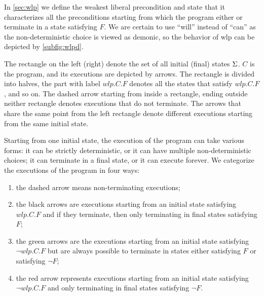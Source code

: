 In \autoref{sec:wlp} we define the weakest liberal precondition and state that it characterizes all the preconditions starting from which the program either  or  terminate in a state satisfying $F$. 
We are certain to use ``will'' instead of ``can'' as the non-deterministic choice is viewed as demonic, so the behavior of wlp can be depicted by \autoref{subfig:wlpd}. 

The rectangle on the left (right) denote the set of all initial (final) states $\S$. 
$C$ is the program, and its executions are depicted by arrows. 
The rectangle is divided into halves, the part with label $wlp.C.F$ denotes all the states that satisfy $wlp.C.F$, and so on. 
The dashed arrow starting from inside a rectangle, ending outside neither rectangle denotes executions that do not terminate. 
The arrows that share the same point from the left rectangle denote different executions starting from the same initial state. 

Starting from one initial state, the execution of the program can take various forms: it can be strictly deterministic, or it can have multiple non-deterministic choices; it can terminate in a final state, or it can execute forever. 
We categorize the executions of the program in four ways: 
\begin{enumerate}
	\item the dashed arrow means non-terminating executions; 
	\item the black arrows are executions starting from an initial state satisfying $wlp.C.F$ and if they terminate, then only terminating in final states satisfying $F$; 
	\item the green arrows are the executions starting from an initial state satisfying $\neg wlp.C.F$ but are always possible to terminate in states either satisfying $F$ or satisfying $\neg F$;
	\item the red arrow represents executions starting from an initial state satisfying $\neg wlp.C.F$ and only terminating in final states satisfying $\neg F$. 
\end{enumerate}



